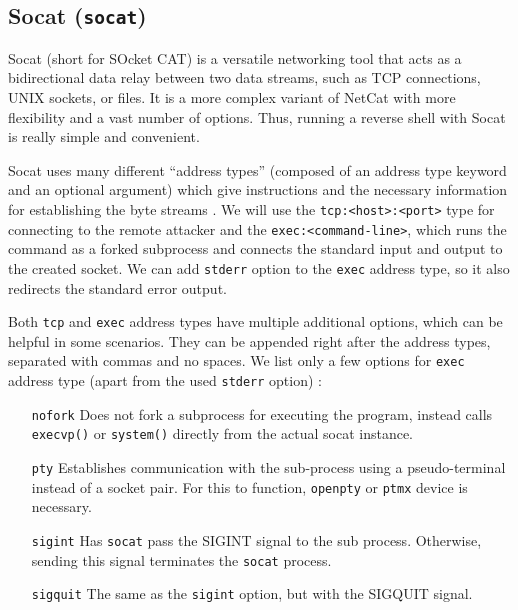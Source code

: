 

\subsection{Socat (\texttt{socat})}


Socat (short for SOcket CAT) is a versatile networking tool that acts as a bidirectional data relay between two data streams, such as TCP connections, UNIX sockets, or files. It is a more complex variant of NetCat with more flexibility and a vast number of options. Thus, running a reverse shell with Socat is really simple and convenient.

Socat uses many different ``address types'' (composed of an address type keyword and an optional argument) which give instructions and the necessary information for establishing the byte streams \cite{socat-man}. We will use the \texttt{tcp:<host>:<port>} type for connecting to the remote attacker and the \texttt{exec:<command-line>}, which runs the command as a forked subprocess and connects the standard input and output to the created socket. We can add \texttt{stderr} option to the \texttt{exec} address type, so it also redirects the standard error output.


Both \texttt{tcp} and \texttt{exec} address types have multiple additional options, which can be helpful in some scenarios. They can be appended right after the address types, separated with commas and no spaces. We list only a few options for \texttt{exec} address type (apart from the used \texttt{stderr} option) \cite{socat-man}:

\newpage

\setlength{\leftmargini}{5em}
\begin{itemize}
\item[\texttt{nofork}] Does not fork a subprocess for executing the program, instead calls \texttt{execvp()} or \texttt{system()} directly from the actual socat instance.
\item[\texttt{pty}] Establishes communication with the sub-process using a pseudo-terminal instead of a socket pair. For this to function, \texttt{openpty} or \texttt{ptmx} device is necessary.
\item[\texttt{sigint}] Has \texttt{socat} pass the SIGINT signal to the sub process. Otherwise, sending this signal terminates the \texttt{socat} process.
\item[\texttt{sigquit}] The same as the \texttt{sigint} option, but with the SIGQUIT signal.
\end{itemize}
\setlength{\leftmargini}{2.5em}


